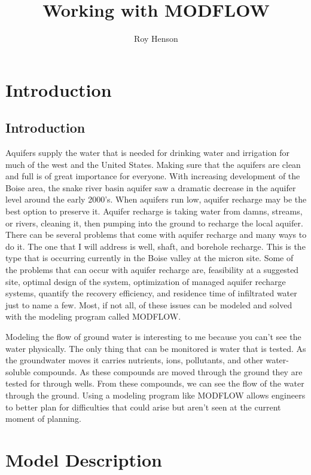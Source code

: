 \documentclass[]{report}
\title{Working with MODFLOW}
\author{Roy Henson}
\begin{document}
\maketitle

\tableofcontents

\chapter{Introduction}
\section{Introduction}
Aquifers supply the water that is needed for drinking water and irrigation for much of the west and the United States. Making sure that the aquifers are clean and full is of great importance for everyone. With increasing development of the Boise area, the snake river basin aquifer saw a dramatic decrease in the aquifer level around the early 2000’s. When aquifers run low, aquifer recharge may be the best option to preserve it.
Aquifer recharge is taking water from damns, streams, or rivers, cleaning it, then pumping into the ground to recharge the local aquifer. There can be several problems that come with aquifer recharge and many ways to do it. The one that I will address is well, shaft, and borehole recharge. This is the type that is occurring currently in the Boise valley at the micron site. Some of the problems that can occur with aquifer recharge are, feasibility at a suggested site, optimal design of the system, optimization of managed aquifer recharge systems, quantify the recovery efficiency, and residence time of infiltrated water just to name a few. Most, if not all, of these issues can be modeled and solved with the modeling program called MODFLOW.

Modeling the flow of ground water is interesting to me because you can’t see the water physically. The only thing that can be monitored is water that is tested. As the groundwater moves it carries nutrients, ions, pollutants, and other water-soluble compounds. As these compounds are moved through the ground they are tested for through wells. From these compounds, we can see the flow of the water through the ground. Using a modeling program like MODFLOW allows engineers to better plan for difficulties that could arise but aren’t seen at the current moment of planning.

\chapter{Model Description}
\end{document}
